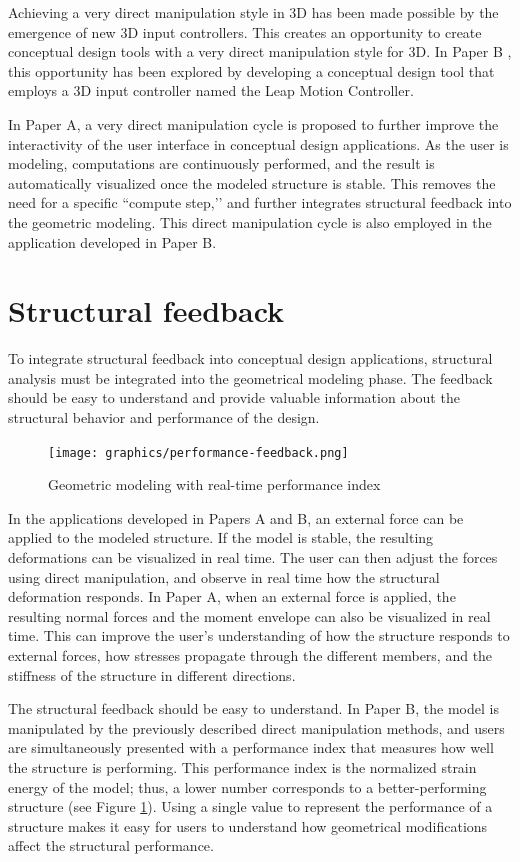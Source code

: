Achieving a very direct manipulation style in 3D has been made possible by the emergence of new 3D input controllers. This creates an opportunity to create conceptual design tools with a very direct manipulation style for 3D. In Paper B , this opportunity has been explored by developing a conceptual design tool that employs a 3D input controller named the Leap Motion Controller. 

In Paper A, a very direct manipulation cycle is proposed to further improve the interactivity of the user interface in conceptual design applications. As the user is modeling, computations are continuously performed, and the result is automatically visualized once the modeled structure is stable. This removes the need for a specific ``compute step,’’ and further integrates structural feedback into the geometric modeling. This direct manipulation cycle is also employed in the application developed in Paper B.

\section{Structural feedback}
To integrate structural feedback into conceptual design applications, structural analysis must be integrated into the geometrical modeling phase. The feedback should be easy to understand and provide valuable information about the structural behavior and performance of the design.

\begin{figure}
  \texttt{[image: graphics/performance-feedback.png]}
  \caption{Geometric modeling with real-time performance index}
  \label{fig:performance-feedback}
\end{figure}

In the applications developed in Papers A and B, an external force can be applied to the modeled structure. If the model is stable, the resulting deformations can be visualized in real time. The user can then adjust the forces using direct manipulation, and observe in real time how the structural deformation responds. In Paper A, when an external force is applied, the resulting normal forces and the moment envelope can also be visualized in real time. This can improve the user’s understanding of how the structure responds to external forces, how stresses propagate through the different members, and the stiffness of the structure in different directions.

The structural feedback should be easy to understand. In Paper B, the model is manipulated by the previously described direct manipulation methods, and users are simultaneously presented with a performance index that measures how well the structure is performing. This performance index is the normalized strain energy of the model; thus, a lower number corresponds to a better-performing structure (see Figure \ref{fig:performance-feedback}). Using a single value to represent the performance of a structure makes it easy for users to understand how geometrical modifications affect the structural performance.


